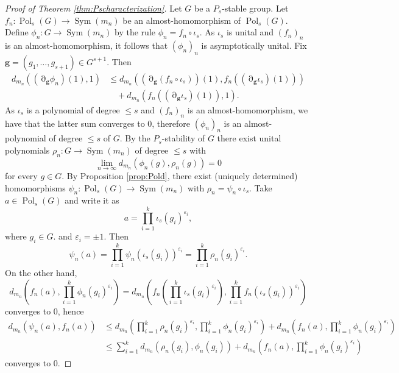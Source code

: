 \documentclass[a4paper,12pt]{amsart}
\theoremstyle{plain}
\theoremstyle{definition}
\theoremstyle{remark}
\numberwithin{equation}{subsection}
\DeclareMathOperator{\Sym}{Sym}
\DeclareMathOperator{\Pold}{Pol}
\DeclareMathOperator{\mypartial}{\partial}
\newcommand{\comment}[1]{\textcolor{purple}{#1}}
\begin{document}
\begin{proof}[Proof of Theorem \ref{thm:Pscharacterization}]
    Let $G$ be a $P_s$-stable group. Let $f_n:\Pold_s(G)\to\Sym(m_n)$ be an almost-homomorphism of $\Pold_s(G)$. Define $\phi_n:G\to\Sym(m_n)$ by the rule $\phi_n=f_n\circ \iota_s$. As $\iota_s$ is unital and $(f_n)_n$ is an almost-homomorphism, it follows that $(\phi_n)_n$ is asymptotically unital. Fix $\mathbf{g}=(g_1,\ldots ,g_{s+1})\in G^{s+1}$. Then
    \begin{align*}
    d_{m_n}((\mypartial_{\mathbf{g}}\phi_n)(1),1) &\le
    d_{m_n}((\mypartial_{\mathbf{g}}(f_n\circ \iota_s))(1),
    f_n((\mypartial_{\mathbf{g}}\iota_s)(1)))\\
    &\quad + d_{m_n}(f_n((\mypartial_{\mathbf{g}}\iota_s)(1)),1). 
    \end{align*}
    As $\iota_s$ is a polynomial of degree $\le s$ and $(f_n)_n$ is an almost-homomorphism, we have that
    the latter sum converges to 0, therefore $(\phi_n)_n$ is an almost-polynomial of degree $\le s$ of $G$. By the $P_s$-stability of $G$ there exist unital polynomials $\rho_n:G\to\Sym(m_n)$ of degree $\le s$ with
    $$\lim_{n\to\infty}d_{m_n}(\phi_n(g),\rho_n(g))=0$$
    for every $g\in G$. By Proposition \ref{prop:Pold}, there exist (uniquely determined) homomorphisms $\psi_n:\Pold_s(G)\to\Sym(m_n)$ with $\rho_n=\psi_n\circ\iota_s$. Take $a\in\Pold_s(G)$ and write it as
$$a=\prod_{i=1}^k\iota_s(g_i)^{\varepsilon_i},$$
where $g_i\in G$. and $\varepsilon_i=\pm 1$. Then
$$\psi_n(a)=\prod_{i=1}^k\psi_n(\iota_s(g_i))^{\varepsilon_i}=\prod_{i=1}^{k}\rho_n(g_i)^{\varepsilon_i}.$$
On the other hand,
$$d_{m_n}\left (f_n(a),\prod_{i=1}^k\phi_n(g_i)^{\varepsilon_i}\right )=d_{m_n}\left (f_n\left (\prod_{i=1}^{k}\iota_s(g_i)^{\varepsilon_i}\right ), \prod_{i=1}^kf_n(\iota_s(g_i))^{\varepsilon_i}\right )$$
converges to 0, hence
\begin{align*}
    d_{m_n}(\psi_n(a),f_n(a)) &\le d_{m_n}\left ( \prod_{i=1}^{k}\rho_n(g_i)^{\varepsilon_i}, \prod_{i=1}^k\phi_n(g_i)^{\varepsilon_i}\right )+
    d_{m_n}\left (f_n(a),\prod_{i=1}^k\phi_n(g_i)^{\varepsilon_i}\right )\\
    &\le \sum_{i=1}^k d_{m_n}(\rho_n(g_i),\phi_n(g_i))+d_{m_n}\left (f_n(a),\prod_{i=1}^k\phi_n(g_i)^{\varepsilon_i}\right )
\end{align*}
converges to 0.


\end{proof}
\end{document}
